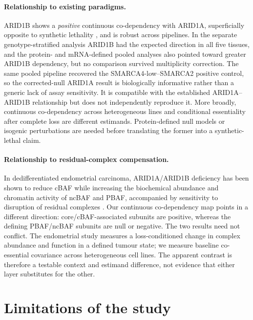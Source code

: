 \documentclass[11pt,a4paper]{article}
\begin{document}
\paragraph{Relationship to existing paradigms.} ARID1B shows a \emph{positive}
continuous co-dependency with ARID1A, superficially opposite to synthetic
lethality \citep{helming2014}, and is robust across pipelines. In the separate
genotype-stratified analysis ARID1B had the expected direction in all five
tissues, and the protein- and mRNA-defined pooled analyses also pointed toward
greater ARID1B dependency, but no comparison survived multiplicity correction.
The same pooled pipeline recovered the SMARCA4-low--SMARCA2 positive control, so
the corrected-null ARID1A result is biologically informative rather than a
generic lack of assay sensitivity. It is compatible with the established
ARID1A--ARID1B relationship but does not independently reproduce it. More
broadly, continuous co-dependency
across heterogeneous lines and conditional essentiality after complete loss are
different estimands. Protein-defined null models or isogenic perturbations are
needed before translating the former into a synthetic-lethal claim.

\paragraph{Relationship to residual-complex compensation.} In dedifferentiated
endometrial carcinoma, ARID1A/ARID1B deficiency has been shown to reduce cBAF
while increasing the biochemical abundance and chromatin activity of ncBAF and
PBAF, accompanied by sensitivity to disruption of residual complexes
\citep{stlaurent2025}. Our continuous co-dependency map points in a different
direction: core/cBAF-associated subunits are positive, whereas the defining
PBAF/ncBAF subunits are null or negative. The two results need not conflict.
The endometrial study measures a loss-conditioned change in complex abundance and
function in a defined tumour state; we measure baseline co-essential covariance
across heterogeneous cell lines. The apparent contrast is therefore a testable
context and estimand difference, not evidence that either layer substitutes for
the other.

\section*{Limitations of the study}
\end{document}
